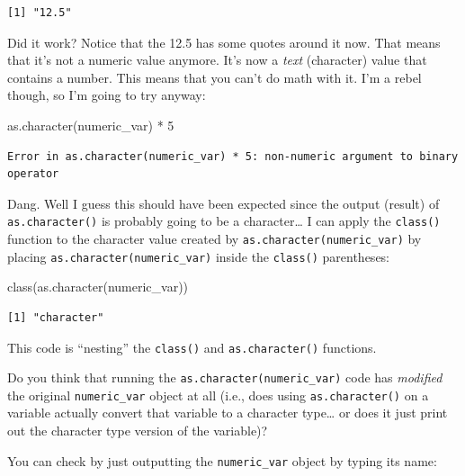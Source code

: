 \documentclass[
  letterpaper,
  DIV=11,
  numbers=noendperiod]{scrreprt}
\newenvironment{Shaded}{\begin{snugshade}}{\end{snugshade}}
\newcommand{\DecValTok}[1]{\textcolor[rgb]{0.68,0.00,0.00}{#1}}
\newcommand{\FunctionTok}[1]{\textcolor[rgb]{0.28,0.35,0.67}{#1}}
\newcommand{\NormalTok}[1]{\textcolor[rgb]{0.00,0.23,0.31}{#1}}
\newcommand{\SpecialCharTok}[1]{\textcolor[rgb]{0.37,0.37,0.37}{#1}}
\begin{document}
\begin{verbatim}
[1] "12.5"
\end{verbatim}

Did it work? Notice that the 12.5 has some quotes around it now. That
means that it's not a numeric value anymore. It's now a \emph{text}
(character) value that contains a number. This means that you can't do
math with it. I'm a rebel though, so I'm going to try anyway:

\begin{Shaded}
\begin{Highlighting}[]
\FunctionTok{as.character}\NormalTok{(numeric\_var) }\SpecialCharTok{*} \DecValTok{5}
\end{Highlighting}
\end{Shaded}

\begin{verbatim}
Error in as.character(numeric_var) * 5: non-numeric argument to binary operator
\end{verbatim}

Dang. Well I guess this should have been expected since the output
(result) of \texttt{as.character()} is probably going to be a
character\ldots{} I can apply the \texttt{class()} function to the
character value created by \texttt{as.character(numeric\_var)} by
placing \texttt{as.character(numeric\_var)} inside the \texttt{class()}
parentheses:

\begin{Shaded}
\begin{Highlighting}[]
\FunctionTok{class}\NormalTok{(}\FunctionTok{as.character}\NormalTok{(numeric\_var))}
\end{Highlighting}
\end{Shaded}

\begin{verbatim}
[1] "character"
\end{verbatim}

This code is ``nesting'' the \texttt{class()} and
\texttt{as.character()} functions.

Do you think that running the \texttt{as.character(numeric\_var)} code
has \emph{modified} the original \texttt{numeric\_var} object at all
(i.e., does using \texttt{as.character()} on a variable actually convert
that variable to a character type\ldots{} or does it just print out the
character type version of the variable)?

You can check by just outputting the \texttt{numeric\_var} object by
typing its name:
\end{document}
